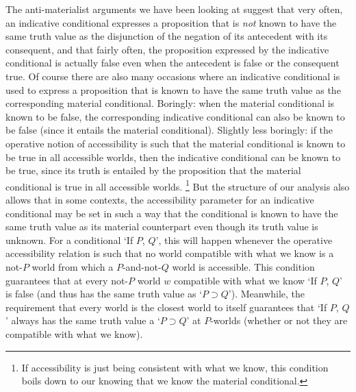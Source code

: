 \documentclass[If.tex]{subfiles}
\begin{document}
\begin{prop}
The anti-materialist arguments we have been looking at suggest that very often, an indicative conditional expresses a proposition that is \emph{not} known to have the same truth value as the disjunction of the negation of its antecedent with its consequent, and that fairly often, the proposition expressed by the indicative conditional is actually false even when the antecedent is false or the consequent true.  Of course there are also many occasions where an indicative conditional is used to express a proposition that is known to have the same truth value as the corresponding material conditional.  Boringly: when the material conditional is known to be false, the corresponding indicative conditional can also be known to be false (since it entails the material conditional).  Slightly less boringly: if the operative notion of accessibility is such that the material conditional is known to be true in all accessible worlds, then the indicative conditional can be known to be true, since its truth is entailed by the proposition that the material conditional is true in all accessible worlds.%
\footnote{If accessibility is just being consistent with what we know, this condition boils down to our knowing that we know the material conditional.}
But the structure of our analysis also allows that in some contexts, the accessibility parameter for an indicative conditional may be set in such a way that the conditional is known to have the same truth value as its material counterpart even though its truth value is unknown.  For a conditional ‘If $P$, $Q$’, this will happen whenever the operative accessibility relation is such that no world compatible with what we know is a not-$P$ world from which a $P$-and-not-$Q$ world is accessible.  This condition guarantees that at every not-$P$ world $w$ compatible with what we know ‘If $P$, $Q$’ is false (and thus has the same truth value as ‘$P⊃Q$’).  Meanwhile, the requirement that every world is the closest world to itself guarantees that ‘If $P$, $Q$’ always has the same truth value a ‘$P⊃Q$’ at $P$-worlds (whether or not they are compatible with what we know).  


\end{prop}
\end{document}
